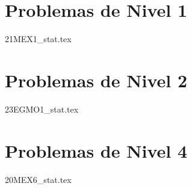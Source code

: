 \section{Problemas de Nivel 1}
{21MEX1_stat.tex} %

\section{Problemas de Nivel 2}
{23EGMO1_stat.tex} %

\section{Problemas de Nivel 4}
{20MEX6_stat.tex} %